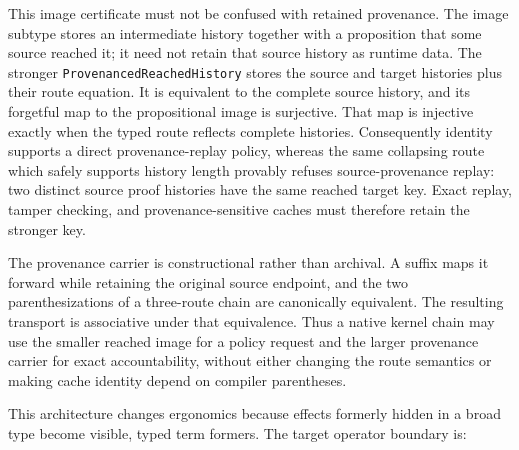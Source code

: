 \documentclass[11pt]{article}
\newcommand{\code}[1]{\texttt{#1}}
\begin{document}
This image certificate must not be confused with retained provenance.  The
image subtype stores an intermediate history together with a proposition that
some source reached it; it need not retain that source history as runtime data.
The stronger \code{ProvenancedReachedHistory} stores the source and target
histories plus their route equation.  It is equivalent to the complete source
history, and its forgetful map to the propositional image is surjective.  That
map is injective exactly when the typed route reflects complete histories.
Consequently identity supports a direct provenance-replay policy, whereas the
same collapsing route which safely supports history length provably refuses
source-provenance replay: two distinct source proof histories have the same
reached target key.  Exact replay, tamper checking, and provenance-sensitive
caches must therefore retain the stronger key.

The provenance carrier is constructional rather than archival.  A suffix maps
it forward while retaining the original source endpoint, and the two
parenthesizations of a three-route chain are canonically equivalent.  The
resulting transport is associative under that equivalence.  Thus a native
kernel chain may use the smaller reached image for a policy request and the
larger provenance carrier for exact accountability, without either changing
the route semantics or making cache identity depend on compiler parentheses.

This architecture changes ergonomics because effects formerly hidden in a broad
type become visible, typed term formers.  The target operator boundary is:
\end{document}
